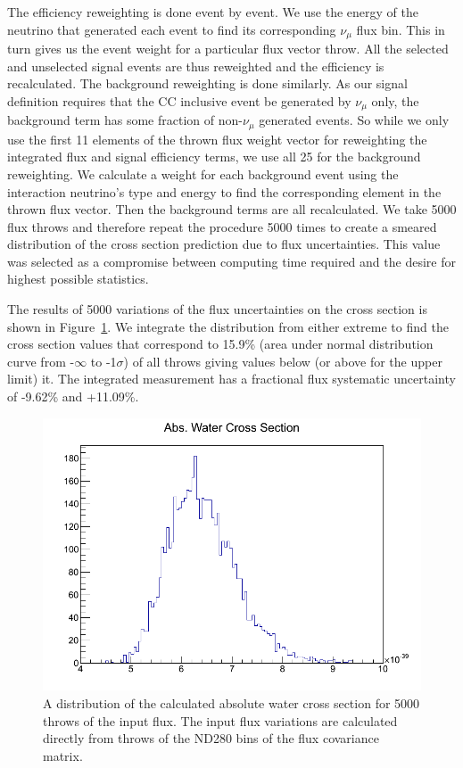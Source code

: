  The efficiency reweighting is done event by event. We use the energy of the neutrino that generated each event to find its corresponding $\nu_\mu$ flux bin. This in turn gives us the event weight for a particular flux vector throw. All the selected and unselected signal events are thus reweighted and the efficiency is recalculated. The background reweighting is done similarly. As our signal definition requires that the CC inclusive event be generated by $\nu_\mu$ only, the background term has some fraction of non-$\nu_\mu$ generated events. So while we only use the first 11 elements of the thrown flux weight vector for reweighting the integrated flux and signal efficiency terms, we use all 25 for the background reweighting. We calculate a weight for each background event using the interaction neutrino's type and energy to find the corresponding element in the thrown flux vector. Then the background terms are all recalculated. We take 5000 flux throws and therefore repeat the procedure 5000 times to create a smeared distribution of the cross section prediction due to flux uncertainties. This value was selected as a compromise between computing time required and the desire for highest possible statistics.

The results of 5000 variations of the flux uncertainties on the cross section is shown in Figure~\ref{fig:fluxvar}. We integrate the distribution from either extreme to find the cross section values that correspond to 15.9\% (area under normal distribution curve from -$\infty$ to -1$\sigma$) of all throws giving values below (or above for the upper limit) it. The integrated measurement has a fractional flux systematic uncertainty of -9.62\% and +11.09\%.

\begin{figure}[h]
\centering
\includegraphics[width=5in]{Figures/fluxvar.png}
\caption{A distribution of the calculated absolute water cross section for 5000 throws of the input flux. The input flux variations are calculated directly from throws of the ND280 bins of the flux covariance matrix.}
\label{fig:fluxvar}
\end{figure}

